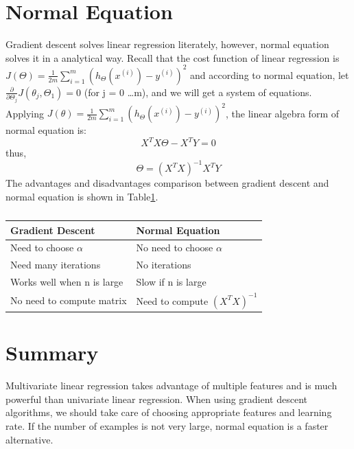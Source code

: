\documentclass{article}
\begin{document}
\section{Normal Equation}
Gradient descent solves linear regression literately, however, normal equation solves it in a analytical way. Recall that the cost function of linear regression is $J(\Theta) = \frac{1}{2m} \sum_{i=1}^{m} (h_\Theta({x^{(i)}})-y^{(i)})^2$ and according to normal equation, let $\frac{\partial}{\partial \Theta_j}J(\theta_j, \Theta_1) = 0$ (for j = 0 \ldots m), and we will get a system of equations. Applying $J(\theta) = \frac{1}{2m} \sum_{i=1}^{m} (h_\Theta({x^{(i)}})-y^{(i)})^2$, the linear algebra form of normal equation is:
\begin{equation}\label{normal_quation_linear_algebra form}
X^{T}X\Theta - X^{T}Y = 0
\end{equation}
thus,
\begin{equation}\label{theta_expression}
\Theta = (X^{T}X)^{-1}X^{T}Y
\end{equation}
The advantages and disadvantages comparison between gradient descent and normal equation is shown in Table\ref{normal_equation_comparison_with_gradient_descent}.
\begin{table}[ht]
\begin{center}
\caption{}\label{normal_equation_comparison_with_gradient_descent}
\begin{tabular}{l|l}
\hline
Gradient Descent & Normal Equation\\
\hline
Need to choose $\alpha$ & No need to choose $\alpha$\\
Need many iterations & No iterations\\
Works well when n is large & Slow if n is large\\
No need to compute matrix & Need to compute $(X^{T}X)^{-1}$\\
\hline
\end{tabular}
\end{center}
\end{table}
\section{Summary}
Multivariate linear regression takes advantage of multiple features and is much powerful than univariate linear regression. When using gradient descent algorithms, we should take care of choosing appropriate features and learning rate. If the number of examples is not very large, normal equation is a faster alternative.
\end{document}
